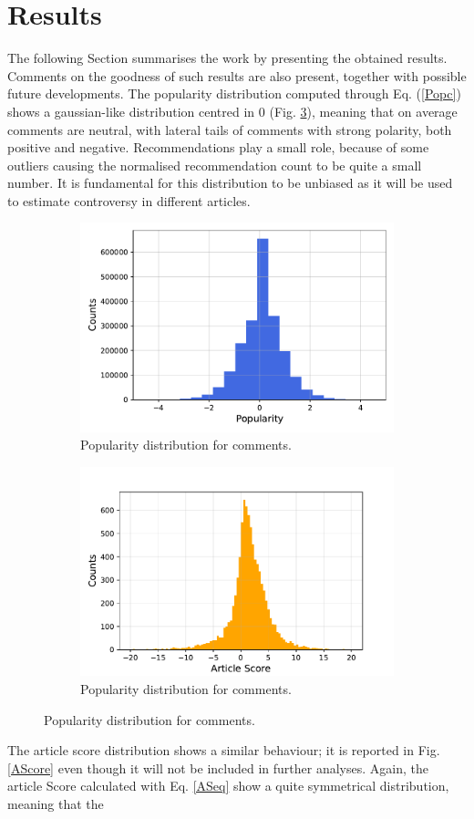 \section{Results}
\label{Resul}

The following Section summarises the work by presenting the obtained results. Comments on the goodness of such results are also present, together with possible future developments. 
The popularity distribution computed through Eq. (\ref{Popc}) shows a gaussian-like distribution centred in 0 (Fig. \ref{PopDist}), meaning that on average comments are neutral, with lateral tails of comments with strong polarity, both positive and negative. Recommendations play a small role, because of some outliers causing the normalised recommendation count to be quite a small number. It is fundamental for this distribution to be unbiased as it will be used to estimate controversy in different articles. 

\begin{figure}
\centering
\begin{subfigure}{0.45\tw}
\includegraphics[width=\tw]{Pictures/PopularityDist.pdf}
\caption{Popularity distribution for comments.}
\label{PopDist}
\end{subfigure}

\begin{subfigure}{0.45\tw}
\includegraphics[width=\tw]{Pictures/articleScoreDist.pdf}
\caption{Popularity distribution for comments.}
\label{PopDist}
\end{subfigure}
\end{figure}

The article score distribution shows a similar behaviour; it is reported in Fig. \ref{AScore} even though it will not be included in further analyses. Again, the article Score calculated with Eq. \ref{ASeq} show a quite symmetrical distribution, meaning that the